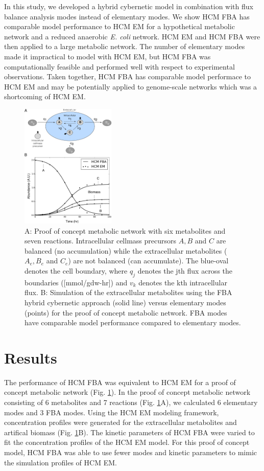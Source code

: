 \documentclass[10pt,twocolumn,twoside,final]{IEEEtran}
\begin{document}
In this study, we developed a hybrid cybernetic model in combination with flux balance analysis modes instead of elementary modes.
We show HCM FBA has comparable model performance to HCM EM for a hypothetical metabolic network and a reduced anaerobic \textit{E. coli} network.
HCM EM and HCM FBA were then applied to a large metabolic network.
The number of elementary modes made it impractical to model with HCM EM, but HCM FBA was computationally feasible and performed well with respect to experimental observations.
Taken together, HCM FBA has comparable model performace to HCM EM and may be potentially applied to genome-scale networks which was a shortcoming of HCM EM.


\begin{figure}[!t]\centering
\includegraphics[width=0.40\textwidth]{./figs/Fig-1-GeneralModel-Results.pdf}
\caption{A: Proof of concept metabolic network with six metabolites and seven reactions.
Intracellular cellmass precursors $A,B$ and $C$ are balanced (no accumulation) while the extracellular metabolites ($A_{e},B_{e}$ and $C_{e}$) are not balanced (can accumulate). The blue-oval denotes the cell boundary, where $q_{j}$ denotes the jth flux across the boundaries ([mmol/gdw-hr]) and $v_{k}$ denotes the kth intracellular flux. B: Simulation of the extracellular metabolites using the FBA hybrid cybernetic approach (solid line) versus elementary modes (points) for the proof of concept metabolic network. FBA modes have comparable model performance compared to elementary modes.
}\label{fig:model-fitting}
\end{figure}

\section{Results}
The performance of HCM FBA was equivalent to HCM EM for a proof of concept metabolic network (Fig. \ref{fig:model-fitting}).
In the proof of concept metabolic network consisting of 6 metabolites and 7 reactions (Fig. \ref{fig:model-fitting}A), we calculated 6 elementary modes and 3 FBA modes.
Using the HCM EM modeling framework, concentration profiles were generated for the extracellular metabolites and artifical biomass (Fig. \ref {fig:model-fitting}B).
The kinetic parameters of HCM FBA were varied to fit the concentration profiles of the HCM EM model.
For this proof of concept model, HCM FBA was able to use fewer modes and kinetic parameters to mimic the simulation profiles of HCM EM.
\end{document}
